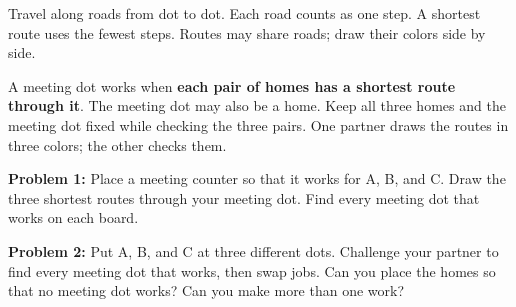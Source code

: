 \documentclass[12pt,letterpaper]{article}
\newcommand{\problem}[2]{\par\textbf{Problem #1:} #2\par}
\newcommand{\grid}[1]{\draw[gray!65,line width=.6pt,step=1] (0,0) grid (#1,#1);\foreach \x in {0,...,#1}\foreach \y in {0,...,#1}\fill (\x,\y) circle (1.7pt);}
\newcommand{\home}[3]{\node[draw,circle,fill=white,inner sep=3pt,font=\bfseries] at (#1,#2){#3};}
\begin{document}
Travel along roads from dot to dot. Each road counts as one step. A shortest route uses the fewest steps. Routes may share roads; draw their colors side by side.

A meeting dot works when \textbf{each pair of homes has a shortest route through it}. The meeting dot may also be a home. Keep all three homes and the meeting dot fixed while checking the three pairs. One partner draws the routes in three colors; the other checks them.

\begin{center}
\end{center}

\problem{1}{Place a meeting counter so that it works for A, B, and C. Draw the three shortest routes through your meeting dot. Find every meeting dot that works on each board.}

\vspace{.25in}
\begin{center}
\hfill
{}
\end{center}
\vfill

\newpage

\problem{2}{Put A, B, and C at three different dots. Challenge your partner to find every meeting dot that works, then swap jobs. Can you place the homes so that no meeting dot works? Can you make more than one work?}

\vspace{.25in}
\begin{center}
\hfill
{}
\vspace{.6in}

\hfill
{}
\end{center}
\end{document}
